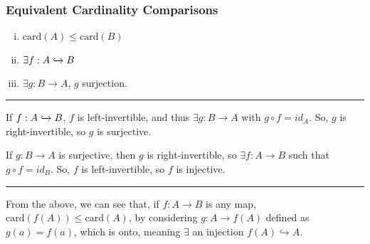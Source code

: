 \documentclass[10pt]{extarticle}
\begin{document}
      \subsubsection{Equivalent Cardinality Comparisons}%
      \begin{enumerate}[(i)]
        \item $\text{card}(A) \leq \text{card}(B)$
        \item $\exists f: A\xhookrightarrow{} B$
        \item $\exists g: B\rightarrow A$, $g$ surjection.
      \end{enumerate}
      \vspace{4pt}
      \rule{\textwidth}{0.4pt}
      \vspace{4pt}
      \begin{description}[font=\normalfont]
        \item[(ii) $\Rightarrow$ (iii)] If $f: A\xhookrightarrow{} B$, $f$ is left-invertible, and thus $\exists g: B\rightarrow A$ with $g\circ f = id_A$. So, $g$ is right-invertible, so $g$ is surjective.
        \item[(iii) $\Rightarrow$ (ii)] If $g: B \rightarrow A$ is surjective, then $g$ is right-invertible, so $\exists f: A\rightarrow B$ such that $g\circ f = id_B$. So, $f$ is left-invertible, so $f$ is injective.
      \end{description}
      \vspace{4pt}
      \rule{\textwidth}{0.4pt}
      \vspace{4pt}
      From the above, we can see that, if $f: A\rightarrow B$ is any map, $\text{card}(f(A)) \leq \text{card}(A)$, by considering $g: A\rightarrow f(A)$ defined as $g(a) = f(a)$, which is onto, meaning $\exists$ an injection $f(A) \hookrightarrow A$.
\end{document}
